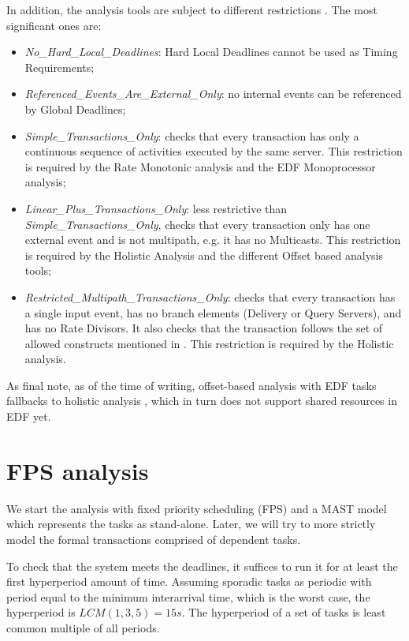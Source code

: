\documentclass{article}
\begin{document}
In addition, the analysis tools are subject to different restrictions \cite{mast-restrictions}. The most significant ones are:

\begin{itemize}
   \item \textit{No\_Hard\_Local\_Deadlines}: Hard Local Deadlines cannot be used as Timing Requirements;
   \item \textit{Referenced\_Events\_Are\_External\_Only}: no internal events can be referenced by Global Deadlines;
   \item \textit{Simple\_Transactions\_Only}: checks that every transaction has only a continuous sequence of activities executed by the same server. This restriction is required by the Rate Monotonic analysis and the EDF Monoprocessor analysis;
   \item \textit{Linear\_Plus\_Transactions\_Only}: less restrictive than \textit{Simple\_Transactions\_Only}, checks that every transaction only has one external event and is not multipath, e.g. it has no Multicasts. This restriction is required by the Holistic Analysis and the different Offset based analysis tools;
   \item \textit{Restricted\_Multipath\_Transactions\_Only}: checks that every transaction has a single input event, has no branch elements (Delivery or Query Servers), and has no Rate Divisors. It also checks that the transaction follows the set of allowed constructs mentioned in \cite{mast-restrictions}. This restriction is required by the Holistic analysis.
\end{itemize}

As final note, as of the time of writing, offset-based analysis with EDF tasks fallbacks to holistic analysis \cite{mast-analysis}, which in turn does not support shared resources in EDF yet.

\section{FPS analysis}

We start the analysis with fixed priority scheduling (FPS) and a MAST model which represents the tasks as stand-alone. Later, we will try to more strictly model the formal transactions comprised of dependent tasks.

To check that the system meets the deadlines, it suffices to run it for at least the first hyperperiod amount of time. Assuming sporadic tasks as periodic with period equal to the minimum interarrival time, which is the worst case, the hyperperiod is $LCM(1, 3, 5) = 15s$. The hyperperiod of a set of tasks is least common multiple of all periods.
\end{document}
